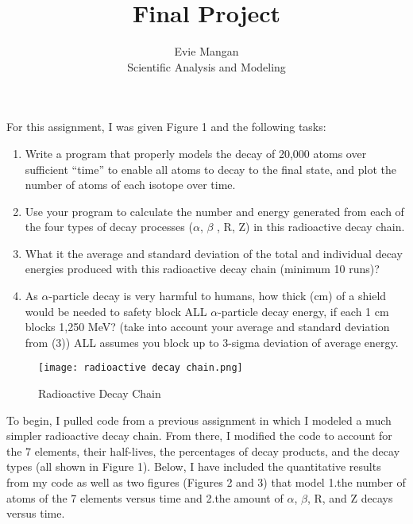 \documentclass[12pt]{article}
\begin{document}
 
 
\title{Final Project}
\author{Evie Mangan\\ %
Scientific Analysis and Modeling}

\maketitle

\noindent For this assignment, I was given Figure 1 and the following tasks: 

\begin{enumerate} %
\item Write a program that properly models the decay of 20,000 atoms over
sufficient “time” to enable all atoms to decay to the final state, and plot the number of atoms of each isotope over time.  
\item Use your program to calculate the number and energy generated from
each of the four types of decay processes ($\alpha$, $\beta$ , R, Z) in this radioactive
decay chain.
\item What it the average and standard deviation of the total and individual decay energies produced with this radioactive decay chain (minimum 10 runs)?
\item As $\alpha$-particle decay is very harmful to humans, how thick (cm) of a shield would be needed to safety block ALL $\alpha$-particle decay energy, if each 1 cm blocks 1,250 MeV? (take into account your average and standard deviation from (3)) ALL assumes you block up to 3-sigma deviation of average energy.
\end{enumerate}

\begin{figure} [h]
    \centering
    \texttt{[image: radioactive decay chain.png]}
    \caption{Radioactive Decay Chain}
    \label{fig:enter-label}
\end{figure}

\noindent  To begin, I pulled code from a previous assignment in which I modeled a much simpler radioactive decay chain. From there, I modified the code to account for the 7 elements, their half-lives, the percentages of decay products, and the decay types (all shown in Figure 1). Below, I have included the quantitative results from my code as well as two figures (Figures 2 and 3) that model 1.the number of atoms of the 7 elements versus time and 2.the amount of $\alpha$, $\beta$, R, and Z decays versus time.
\end{document}
